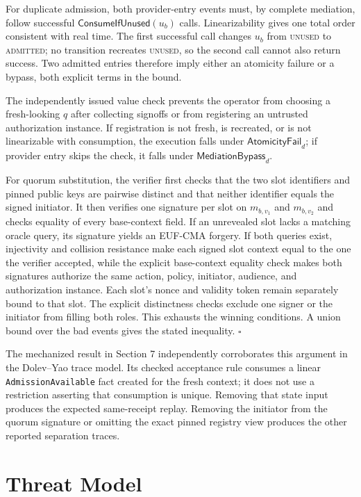 \documentclass[11pt]{article}
\newcommand{\code}[1]{\texttt{#1}}
\begin{document}
For duplicate admission, both provider-entry events must, by complete
mediation, follow successful $\mathsf{ConsumeIfUnused}(u_b)$ calls.
Linearizability gives one total order consistent with real time. The first
successful call changes $u_b$ from \textsc{unused} to \textsc{admitted}; no
transition recreates \textsc{unused}, so the second call cannot also return
success. Two admitted entries therefore imply either an atomicity failure or a
bypass, both explicit terms in the bound.

The independently issued value check prevents the operator from choosing a
fresh-looking $q$ after collecting signoffs or from registering an untrusted
authorization instance. If registration is not fresh, is recreated, or is not
linearizable with consumption, the execution falls under
$\mathsf{AtomicityFail}_d$; if provider entry skips the check, it falls under
$\mathsf{MediationBypass}_d$.

For quorum substitution, the verifier first checks that the two slot
identifiers and pinned public keys are pairwise distinct and that neither
identifier equals the signed initiator. It then verifies one signature per slot
on $m_{b,v_1}$ and $m_{b,v_2}$ and checks equality of every base-context field.
If an unrevealed slot lacks a matching oracle query, its signature yields an
EUF-CMA forgery. If both queries exist, injectivity and collision resistance
make each signed slot context equal to the one the verifier accepted, while the
explicit base-context equality check makes both signatures authorize the same
action, policy, initiator, audience, and authorization instance. Each slot's
nonce and validity token remain separately bound to that slot. The explicit
distinctness checks exclude one signer or the initiator from
filling both roles. This exhausts the winning conditions. A union bound over the
bad events gives the stated inequality. \hfill$\square$

The mechanized result in Section 7 independently corroborates this argument in
the Dolev--Yao trace model. Its checked acceptance rule consumes a linear
\code{AdmissionAvailable} fact created for the fresh context; it does not use a
restriction asserting that consumption is unique. Removing that state input
produces the expected same-receipt replay. Removing the initiator from the
quorum signature or omitting the exact pinned registry view produces the other
reported separation traces.

\section{Threat Model}
\end{document}
